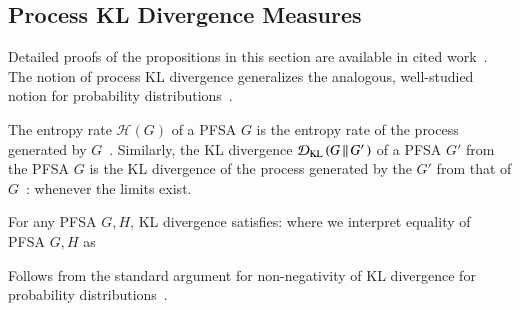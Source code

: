 \documentclass[9pt,journal,compsoc]{IEEEtran}
\begin{document}
{   \subsection{Process KL Divergence Measures}
   Detailed proofs of the propositions in this section are available in  cited work~\cite{chattopadhyay2020deep}. The notion of process KL divergence generalizes the analogous, well-studied notion for probability distributions~\cite{cover2012elements}.
 \label{sec:ProcessKLDiv}
   \begin{defn}\label{defKL}
     The entropy rate $\mathcal{H}(G)$ of a PFSA $G$ is the entropy rate of the  process generated by $G$~\cite{cover2012elements}. Similarly, the KL divergence $\mathcal{D}_{\textrm{KL}}\left( G\,{\left\Vert\,G'\right.} \right)$ of a PFSA $G'$ from the PFSA $G$ is the KL divergence of the process generated by the $G'$ from that of $G$~\cite{vidyasagar2007bounds}:
     whenever the limits exist.
   \end{defn}
   \begin{lem}
     For any PFSA $G,H$, KL divergence satisfies:
     where we interpret equality of PFSA $G,H$ as
   \end{lem}
   \begin{IEEEproof}
 Follows from the standard argument for  non-negativity of KL divergence for probability distributions~\cite{cover2012elements}.
   \end{IEEEproof}
  
}
\end{document}
